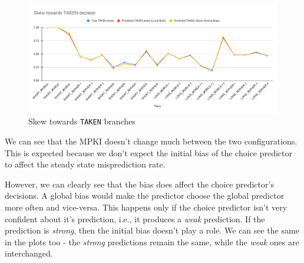 \documentclass[12pt,a4paper,english]{paper}
\begin{document}
\begin{figure}[H]
    \centering
    \includegraphics[scale=0.4]{Skew towards TAKEN decision.png}
    \caption{Skew towards \texttt{TAKEN} branches}
\end{figure}

We can see that the MPKI doesn't change much between the two configurations. This is expected because we don't expect the initial bias of the choice predictor to affect the steady state misprediction rate.

However, we can clearly see that the bias does affect the choice predictor's decisions. A global bias would make the predictor choose the global predictor more often and vice-versa. This happens only if the choice predictor isn't very confident about it's prediction, i.e., it produces a \textit{weak} prediction. If the prediction is \textit{strong}, then the initial bias doesn't play a role. We can see the same in the plots too - the \textit{strong} predictions remain the same, while the \textit{weak} ones are interchanged.





\end{document}
